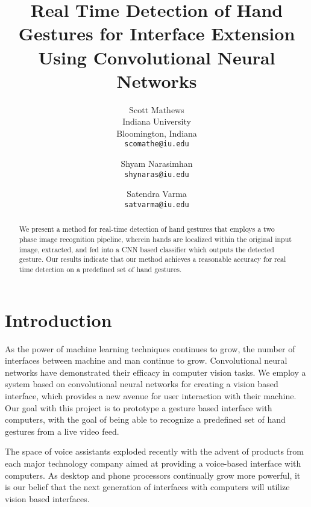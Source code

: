 \documentclass[10pt,twocolumn,letterpaper]{article}
\begin{document}
\title{Real Time Detection of Hand Gestures for Interface Extension Using Convolutional Neural Networks}

\author{Scott Mathews\\
Indiana University\\
Bloomington, Indiana\\
{\tt\small scomathe@iu.edu}
\and
Shyam Narasimhan\\
{\tt\small shynaras@iu.edu}
\and
Satendra Varma\\
{\tt\small satvarma@iu.edu}\\
}

\maketitle

\begin{abstract}
   We present a method for real-time detection of hand gestures that employs a two phase image recognition pipeline, wherein hands are localized within the original input image, extracted, and fed into a CNN based classifier which outputs the detected gesture. Our results indicate that our method achieves a reasonable accuracy for real time detection on a predefined set of hand gestures.
\end{abstract}

\section{Introduction}

As the power of machine learning techniques continues to grow, the number of interfaces between machine and man continue to grow. Convolutional neural networks have demonstrated their efficacy in computer vision tasks. We employ a system based on convolutional neural networks for creating a vision based interface, which provides a new avenue for user interaction with their machine. Our goal with this project is to prototype a gesture based interface with computers, with the goal of being able to recognize a predefined set of hand gestures from  a live video feed.

The space of voice assistants exploded recently with the advent of products from each major technology company aimed at providing a voice-based interface with computers. As desktop and phone processors continually grow more powerful, it is our belief that the next generation of interfaces with computers will utilize vision based interfaces.
\end{document}
